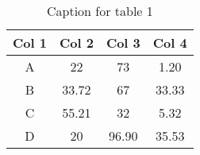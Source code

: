\begin{table}
    \caption{Caption for table 1}
      \centering
      \begin{tabular}{c c c c }
        \toprule
        \textbf{Col 1} & \textbf{Col 2} & \textbf{Col 3} & \textbf{Col 4}\\
        \midrule
        A & 22 & 73 & 1.20\\
        B & 33.72 & 67 & 33.33\\
        C & 55.21 & 32 & 5.32\\
        {\color{blue}D} & 20 & 96.90 & {\color{blue}35.53}\\
        \bottomrule
      \end{tabular}
      \label{tab:table1}
\end{table}
